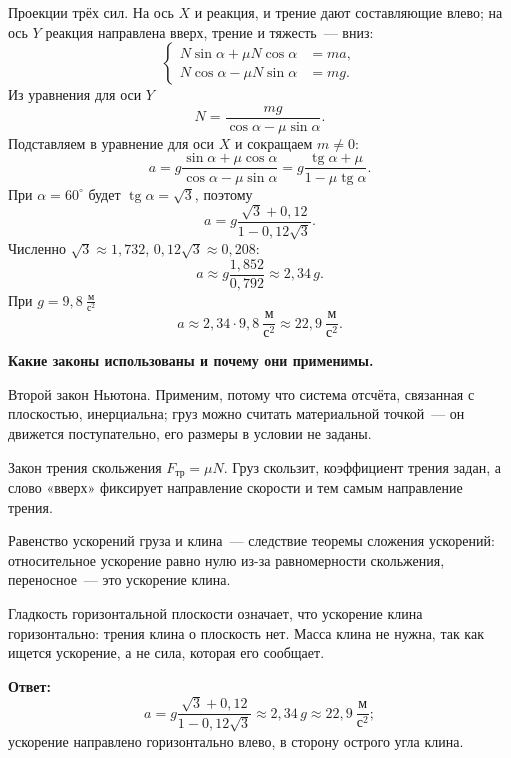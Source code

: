 \documentclass{minimal}
\DeclareMathOperator{\tg}{tg}
\begin{document}
    Проекции трёх сил. На ось \(X\) и реакция, и трение дают составляющие влево; на ось \(Y\) реакция направлена вверх, трение и тяжесть~— вниз:
    \[
        \left\{
        \begin{aligned}
            N\sin\alpha + \mu N\cos\alpha &= ma,\\
            N\cos\alpha - \mu N\sin\alpha &= mg.
        \end{aligned}
        \right.
    \]
    Из уравнения для оси \(Y\)
    \[
        N = \frac{mg}{\cos\alpha - \mu\sin\alpha}.
    \]
    Подставляем в уравнение для оси \(X\) и сокращаем \(m \neq 0\):
    \[
        a = g\frac{\sin\alpha + \mu\cos\alpha}{\cos\alpha - \mu\sin\alpha} = g\frac{\tg\alpha + \mu}{1 - \mu\tg\alpha}.
    \]
    При \(\alpha = 60^\circ\) будет \(\tg\alpha = \sqrt{3}\), поэтому
    \[
        a = g\frac{\sqrt{3} + 0{,}12}{1 - 0{,}12\sqrt{3}}.
    \]
    Численно \(\sqrt{3} \approx 1{,}732\), \(0{,}12\sqrt{3} \approx 0{,}208\):
    \[
        a \approx g\frac{1{,}852}{0{,}792} \approx 2{,}34\,g.
    \]
    При \(g = 9{,}8~\frac{\text{м}}{\text{с}^2}\)
    \[
        a \approx 2{,}34 \cdot 9{,}8~\frac{\text{м}}{\text{с}^2} \approx 22{,}9~\frac{\text{м}}{\text{с}^2}.
    \]

    \textbf{Какие законы использованы и почему они применимы.}

    Второй закон Ньютона. Применим, потому что система отсчёта, связанная с плоскостью, инерциальна; груз можно считать материальной точкой~— он движется поступательно, его размеры в условии не заданы.

    Закон трения скольжения \(F_{\text{тр}} = \mu N\). Груз скользит, коэффициент трения задан, а слово «вверх» фиксирует направление скорости и тем самым направление трения.

    Равенство ускорений груза и клина~— следствие теоремы сложения ускорений: относительное ускорение равно нулю из-за равномерности скольжения, переносное~— это ускорение клина.

    Гладкость горизонтальной плоскости означает, что ускорение клина горизонтально: трения клина о плоскость нет. Масса клина не нужна, так как ищется ускорение, а не сила, которая его сообщает.

    \textbf{Ответ:}
    \[
        a = g\frac{\sqrt{3} + 0{,}12}{1 - 0{,}12\sqrt{3}} \approx 2{,}34\,g \approx 22{,}9~\frac{\text{м}}{\text{с}^2};
    \]
    ускорение направлено горизонтально влево, в сторону острого угла клина.
\end{document}
